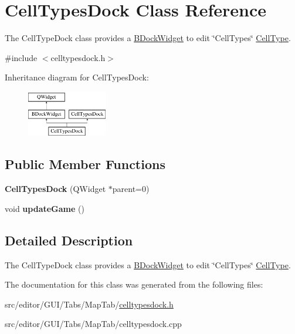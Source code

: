 \hypertarget{class_cell_types_dock}{\section{\-Cell\-Types\-Dock \-Class \-Reference}
\label{class_cell_types_dock}
}


\-The \-Cell\-Type\-Dock class provides a \hyperlink{class_b_dock_widget}{\-B\-Dock\-Widget} to edit \char`\"{}\-Cell\-Types\char`\"{} \hyperlink{class_cell_type}{\-Cell\-Type}.  




{\ttfamily \#include $<$celltypesdock.\-h$>$}

\-Inheritance diagram for \-Cell\-Types\-Dock\-:\begin{figure}[H]
\begin{center}
\leavevmode
\includegraphics[height=2.000000cm]{class_cell_types_dock}
\end{center}
\end{figure}
\subsection*{\-Public \-Member \-Functions}
\begin{DoxyCompactItemize}
\item 
\hypertarget{class_cell_types_dock_a0e1bc992465cea9c1fc71866b425fcbb}{{\bfseries \-Cell\-Types\-Dock} (\-Q\-Widget $\ast$parent=0)}\label{class_cell_types_dock_a0e1bc992465cea9c1fc71866b425fcbb}

\item 
\hypertarget{class_cell_types_dock_a700565cc4bb4c3e87d219d4d4726e680}{void {\bfseries update\-Game} ()}\label{class_cell_types_dock_a700565cc4bb4c3e87d219d4d4726e680}

\end{DoxyCompactItemize}


\subsection{\-Detailed \-Description}
\-The \-Cell\-Type\-Dock class provides a \hyperlink{class_b_dock_widget}{\-B\-Dock\-Widget} to edit \char`\"{}\-Cell\-Types\char`\"{} \hyperlink{class_cell_type}{\-Cell\-Type}. 

\-The documentation for this class was generated from the following files\-:\begin{DoxyCompactItemize}
\item 
src/editor/\-G\-U\-I/\-Tabs/\-Map\-Tab/\hyperlink{celltypesdock_8h}{celltypesdock.\-h}\item 
src/editor/\-G\-U\-I/\-Tabs/\-Map\-Tab/celltypesdock.\-cpp\end{DoxyCompactItemize}
